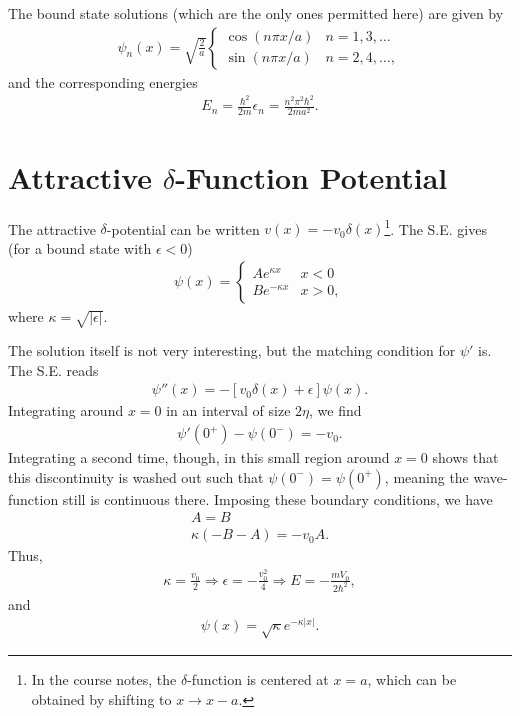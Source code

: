The bound state solutions (which are the only ones permitted here) are given by 
\begin{eqnarray}
    \psi_{n}(x) = \sqrt{\frac{2}{a}} \begin{cases}
        \cos(n \pi x / a) & n = 1,3,\ldots \\
        \sin(n \pi x / a) & n = 2,4,\ldots
    ,\end{cases}
\end{eqnarray}
and the corresponding energies
\begin{eqnarray}
    E_{n} = \frac{\hbar^2}{2m} \epsilon_{n} = \frac{n^2 \pi^2 \hbar^2}{2m a^2}
.\end{eqnarray}


\section{Attractive $\delta$-Function Potential}

The attractive $\delta$-potential can be written $v(x) = -v_0 \delta(x)$\footnote{In the course notes, the $\delta$-function is centered at $x = a$, which can be obtained by shifting to $x \rightarrow x - a$.}.
The S.E. gives (for a bound state with $\epsilon < 0$)
\begin{eqnarray}
    \psi(x) = \begin{cases}
        A e^{\kappa x} & x < 0 \\
        B e^{-\kappa x} & x > 0
    ,\end{cases}
\end{eqnarray}
where $\kappa = \sqrt{|\epsilon|}$.

The solution itself is not very interesting, but the matching condition for $\psi'$ is.
The S.E. reads
\begin{eqnarray}
    \psi''(x) = -[v_0 \delta(x) + \epsilon] \psi(x)
.\end{eqnarray}
Integrating around $x=0$ in an interval of size $2 \eta$, we find
\begin{eqnarray}
    \psi'(0^{+}) - \psi(0^{-}) = -v_0
.\end{eqnarray}
Integrating a second time, though, in this small region around $x = 0$ shows that this discontinuity is washed out such that $\psi(0^{-}) = \psi(0^{+})$, meaning the wave-function still is continuous there.
Imposing these boundary conditions, we have
\begin{gather}
    A = B \\
    \kappa (-B - A) = -v_0 A
.\end{gather}
Thus,
\begin{eqnarray}
    \kappa = \frac{v_0}{2} \Rightarrow \epsilon = -\frac{v_0^2}{4} \Rightarrow E = - \frac{m V_0}{2 \hbar^2}
,\end{eqnarray}
and
\begin{eqnarray}
    \psi(x) = \sqrt{\kappa} e^{-\kappa |x|}
.\end{eqnarray}

